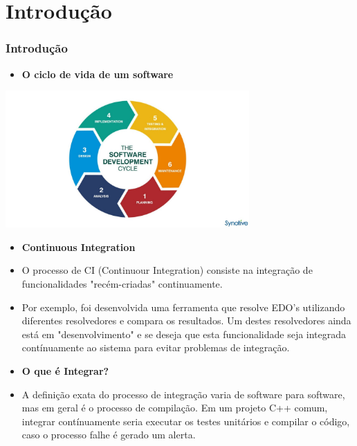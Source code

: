 \documentclass[10pt]{beamer}
\theoremstyle{remark}
\theoremstyle{definition}
\begin{document}
\section{Introdução}
\begin{frame}[allowframebreaks]
\frametitle{Introdução}
	\begin{itemize}
		\item \textbf{O ciclo de vida de um software}
		
	\end{itemize}
	
	\begin{center}
		\includegraphics[width=0.7\textwidth]{images/05.jpg}
	\end{center}
	
	\framebreak
	
	\begin{itemize}
		\item \textbf{Continuous Integration}
		
		\item O processo de CI (Continuour Integration) consiste na integração de funcionalidades "recém-criadas" continuamente.
		
		\item Por exemplo, foi desenvolvida uma ferramenta que resolve EDO's utilizando diferentes resolvedores e compara os resultados. Um destes resolvedores ainda está em "desenvolvimento" e se deseja que esta funcionalidade seja integrada contínuamente ao sistema para evitar problemas de integração.
		
	\end{itemize}
	
	\framebreak
	
	\begin{itemize}
		\item \textbf{O que é Integrar?}
		
		\item A definição exata do processo de integração varia de software para software, mas em geral é o processo de compilação. Em um projeto C++ comum, integrar contínuamente seria executar os testes unitários e compilar o código, caso o processo falhe é gerado um alerta.
		

\end{itemize}
\end{frame}
\end{document}
